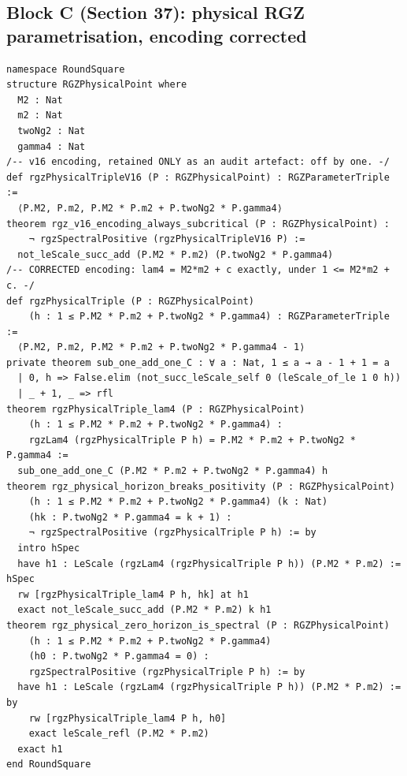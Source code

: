 \documentclass[11pt,a4paper]{article}
\theoremstyle{plain}
\theoremstyle{definition}
\theoremstyle{remark}
\renewcommand{\_}{\oldunderscore\allowbreak}
\begin{document}
\subsection{Block C (Section 37): physical RGZ parametrisation, encoding corrected}
\begin{lstlisting}
namespace RoundSquare
structure RGZPhysicalPoint where
  M2 : Nat
  m2 : Nat
  twoNg2 : Nat
  gamma4 : Nat
/-- v16 encoding, retained ONLY as an audit artefact: off by one. -/
def rgzPhysicalTripleV16 (P : RGZPhysicalPoint) : RGZParameterTriple :=
  ⟨P.M2, P.m2, P.M2 * P.m2 + P.twoNg2 * P.gamma4⟩
theorem rgz_v16_encoding_always_subcritical (P : RGZPhysicalPoint) :
    ¬ rgzSpectralPositive (rgzPhysicalTripleV16 P) :=
  not_leScale_succ_add (P.M2 * P.m2) (P.twoNg2 * P.gamma4)
/-- CORRECTED encoding: lam4 = M2*m2 + c exactly, under 1 <= M2*m2 + c. -/
def rgzPhysicalTriple (P : RGZPhysicalPoint)
    (h : 1 ≤ P.M2 * P.m2 + P.twoNg2 * P.gamma4) : RGZParameterTriple :=
  ⟨P.M2, P.m2, P.M2 * P.m2 + P.twoNg2 * P.gamma4 - 1⟩
private theorem sub_one_add_one_C : ∀ a : Nat, 1 ≤ a → a - 1 + 1 = a
  | 0, h => False.elim (not_succ_leScale_self 0 (leScale_of_le 1 0 h))
  | _ + 1, _ => rfl
theorem rgzPhysicalTriple_lam4 (P : RGZPhysicalPoint)
    (h : 1 ≤ P.M2 * P.m2 + P.twoNg2 * P.gamma4) :
    rgzLam4 (rgzPhysicalTriple P h) = P.M2 * P.m2 + P.twoNg2 * P.gamma4 :=
  sub_one_add_one_C (P.M2 * P.m2 + P.twoNg2 * P.gamma4) h
theorem rgz_physical_horizon_breaks_positivity (P : RGZPhysicalPoint)
    (h : 1 ≤ P.M2 * P.m2 + P.twoNg2 * P.gamma4) (k : Nat)
    (hk : P.twoNg2 * P.gamma4 = k + 1) :
    ¬ rgzSpectralPositive (rgzPhysicalTriple P h) := by
  intro hSpec
  have h1 : LeScale (rgzLam4 (rgzPhysicalTriple P h)) (P.M2 * P.m2) := hSpec
  rw [rgzPhysicalTriple_lam4 P h, hk] at h1
  exact not_leScale_succ_add (P.M2 * P.m2) k h1
theorem rgz_physical_zero_horizon_is_spectral (P : RGZPhysicalPoint)
    (h : 1 ≤ P.M2 * P.m2 + P.twoNg2 * P.gamma4)
    (h0 : P.twoNg2 * P.gamma4 = 0) :
    rgzSpectralPositive (rgzPhysicalTriple P h) := by
  have h1 : LeScale (rgzLam4 (rgzPhysicalTriple P h)) (P.M2 * P.m2) := by
    rw [rgzPhysicalTriple_lam4 P h, h0]
    exact leScale_refl (P.M2 * P.m2)
  exact h1
end RoundSquare
\end{lstlisting}
\end{document}
